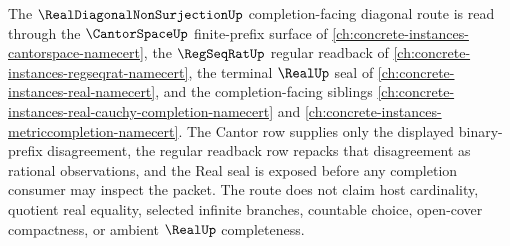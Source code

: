 The $\RealDiagonalNonSurjectionUp$ completion-facing diagonal route is read through the $\CantorSpaceUp$ finite-prefix surface of \autoref{ch:concrete-instances-cantorspace-namecert}, the $\RegSeqRatUp$ regular readback of \autoref{ch:concrete-instances-regseqrat-namecert}, the terminal $\RealUp$ seal of \autoref{ch:concrete-instances-real-namecert}, and the completion-facing siblings \autoref{ch:concrete-instances-real-cauchy-completion-namecert} and \autoref{ch:concrete-instances-metriccompletion-namecert}. The Cantor row supplies only the displayed binary-prefix disagreement, the regular readback row repacks that disagreement as rational observations, and the Real seal is exposed before any completion consumer may inspect the packet. The route does not claim host cardinality, quotient real equality, selected infinite branches, countable choice, open-cover compactness, or ambient $\RealUp$ completeness.
